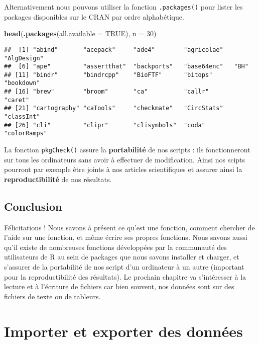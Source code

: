 \documentclass[]{book}
\newenvironment{Shaded}{\begin{snugshade}}{\end{snugshade}}
\newcommand{\KeywordTok}[1]{\textcolor[rgb]{0.13,0.29,0.53}{\textbf{#1}}}
\newcommand{\DataTypeTok}[1]{\textcolor[rgb]{0.13,0.29,0.53}{#1}}
\newcommand{\DecValTok}[1]{\textcolor[rgb]{0.00,0.00,0.81}{#1}}
\newcommand{\OtherTok}[1]{\textcolor[rgb]{0.56,0.35,0.01}{#1}}
\newcommand{\NormalTok}[1]{#1}
\theoremstyle{definition}
\theoremstyle{definition}
\theoremstyle{definition}
\theoremstyle{remark}
\begin{document}
Alternativement nous pouvons utiliser la fonction \texttt{.packages()}
pour lister les packages disponibles sur le CRAN par ordre alphabétique.

\begin{Shaded}
\begin{Highlighting}[]
\KeywordTok{head}\NormalTok{(}\KeywordTok{.packages}\NormalTok{(}\DataTypeTok{all.available =} \OtherTok{TRUE}\NormalTok{), }\DataTypeTok{n =} \DecValTok{30}\NormalTok{)}
\end{Highlighting}
\end{Shaded}

\begin{verbatim}
##  [1] "abind"       "acepack"     "ade4"        "agricolae"   "AlgDesign"  
##  [6] "ape"         "assertthat"  "backports"   "base64enc"   "BH"         
## [11] "bindr"       "bindrcpp"    "BioFTF"      "bitops"      "bookdown"   
## [16] "brew"        "broom"       "ca"          "callr"       "caret"      
## [21] "cartography" "caTools"     "checkmate"   "CircStats"   "classInt"   
## [26] "cli"         "clipr"       "clisymbols"  "coda"        "colorRamps"
\end{verbatim}

La fonction \texttt{pkgCheck()} assure la \textbf{portabilité} de nos
scripts : ils fonctionneront sur tous les ordinateurs sans avoir à
effectuer de modification. Ainsi nos scipts pourront par exemple être
joints à nos articles scientifiques et assurer ainsi la
\textbf{reproductibilité} de nos résultats.

\section{Conclusion}\label{conclusion-4}

Félicitations ! Nous savons à présent ce qu'est une fonction, comment
chercher de l'aide sur une fonction, et même écrire ses propres
fonctions. Nous savons aussi qu'il existe de nombreuses fonctions
développées par la communauté des utilisateurs de R au sein de packages
que nous savons installer et charger, et s'assurer de la portabilité de
nos script d'un ordinateur à un autre (important pour la
reproductibilité des résultats). Le prochain chapitre va s'intéresser à
la lecture et à l'écriture de fichiers car bien souvent, nos données
sont sur des fichiers de texte ou de tableurs.

\hypertarget{import}{\chapter{Importer et exporter des
données}\label{import}}
\end{document}
